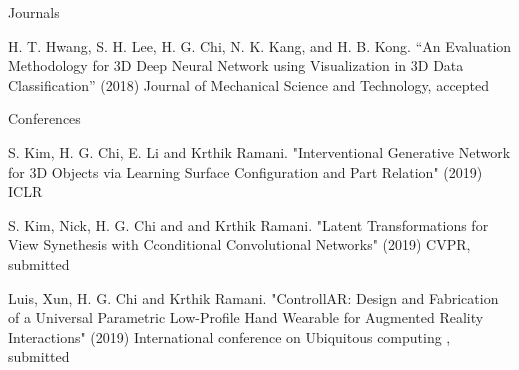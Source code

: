 


\begin{cventries}


\cventry
{} %
{Journals} %
{} %
{} %
{ %
\begin{cvitems}
\item {H. T. Hwang, S. H. Lee, H. G. Chi, N. K. Kang, and H. B. Kong. “An Evaluation Methodology for 3D Deep Neural Network using Visualization in 3D Data Classification” (2018) Journal of Mechanical Science and Technology, accepted}
\end{cvitems}
}


\cventry
{} %
{Conferences} %
{} %
{} %
{ %
\begin{cvitems}
\item {S. Kim, H. G. Chi, E. Li and Krthik Ramani. "Interventional Generative Network for 3D Objects via Learning Surface Configuration and Part Relation" (2019) ICLR}
\item {S. Kim, Nick, H. G. Chi and and Krthik Ramani. "Latent Transformations for View Synethesis with Cconditional Convolutional Networks" (2019) CVPR, submitted}
\item {Luis, Xun, H. G. Chi and Krthik Ramani. "ControllAR: Design and Fabrication of a Universal Parametric Low-Profile Hand Wearable for Augmented Reality Interactions" (2019) International conference on Ubiquitous computing , submitted}
\end{cvitems}
}


\end{cventries}